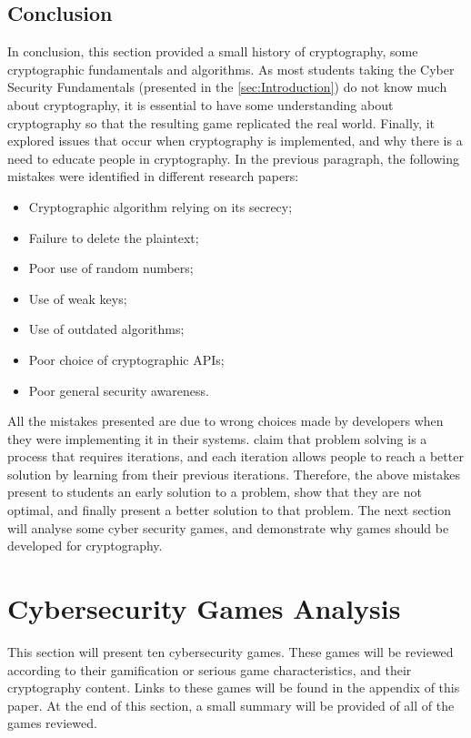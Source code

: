 \documentclass{l4proj}
\begin{document}
\subsection{Conclusion}

In conclusion, this section provided a small history of cryptography, some cryptographic fundamentals and algorithms. 
As most students taking the Cyber Security Fundamentals (presented in the \ref{sec:Introduction}) do not know much about cryptography, 
it is essential to have some understanding about cryptography so that the resulting game replicated the real world.
Finally, it explored issues that occur when cryptography is implemented, and why there is a need to educate people in cryptography.
In the previous paragraph, the following mistakes were identified in different research papers:
\begin{itemize}
    \item Cryptographic algorithm relying on its secrecy;
    \item Failure to delete the plaintext;
    \item Poor use of random numbers;
    \item Use of weak keys;
    \item Use of outdated algorithms;
    \item Poor choice of cryptographic APIs;
    \item Poor general security awareness.
\end{itemize}
All the mistakes presented are due to wrong choices made by developers when they were implementing it in their systems.
\citet{eggleton_value_2001} claim that problem solving is a process that requires iterations, and each iteration allows
people to reach a better solution by learning from their previous iterations. 
Therefore, the above mistakes present to students an early solution to a problem, show that they are not optimal, and
finally present a better solution to that problem. 
The next section will analyse some cyber security games, and demonstrate why games should be developed for cryptography.

\section{Cybersecurity Games Analysis}

This section will present ten cybersecurity games. These games will be reviewed according to their gamification or serious game characteristics,
and their cryptography content. Links to these games will be found in the appendix of this paper. 
At the end of this section, a small summary will be provided of all of the games reviewed.
\end{document}
